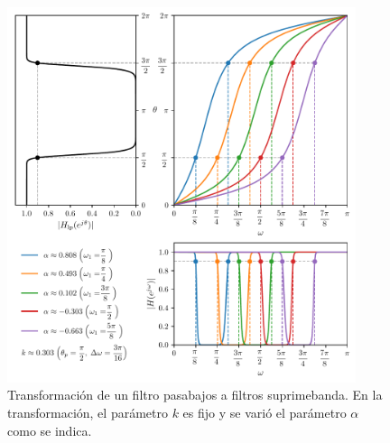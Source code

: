 \documentclass[a4paper]{report}
\begin{document}
\begin{figure}[!htb]
 \begin{center}
 \includegraphics[width=0.91\textwidth]{figuras/filter_design_frequency_transformations_low_bandstop_alpha.pdf}
 \caption{\label{fig:filter_design_frequency_transformations_low_bandstop_alpha} Transformación de un filtro pasabajos a filtros suprimebanda. En la transformación, el parámetro \(k\) es fijo y se varió el parámetro \(\alpha\) como se indica.}
 \end{center}
\end{figure}
\end{document}
